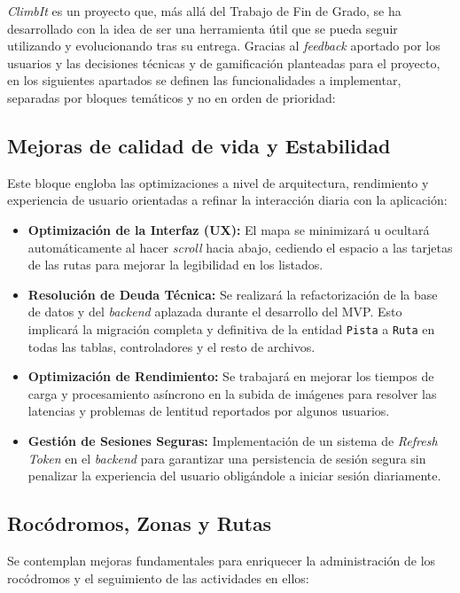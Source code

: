 \textit{ClimbIt} es un proyecto que, más allá del Trabajo de Fin de Grado, se ha desarrollado con la idea de ser una herramienta útil que se pueda seguir utilizando y evolucionando tras su entrega. Gracias al \textit{feedback} aportado por los usuarios y las decisiones técnicas y de gamificación planteadas para el proyecto, en los siguientes apartados se definen las funcionalidades a implementar, separadas por bloques temáticos y no en orden de prioridad:

\subsection{Mejoras de calidad de vida y Estabilidad}
Este bloque engloba las optimizaciones a nivel de arquitectura, rendimiento y experiencia de usuario orientadas a refinar la interacción diaria con la aplicación:

\begin{itemize}
    \item \textbf{Optimización de la Interfaz (UX):} El mapa se minimizará u ocultará automáticamente al hacer \textit{scroll} hacia abajo, cediendo el espacio a las tarjetas de las rutas para mejorar la legibilidad en los listados.
    \item \textbf{Resolución de Deuda Técnica:} Se realizará la refactorización de la base de datos y del \textit{backend} aplazada durante el desarrollo del MVP. Esto implicará la migración completa y definitiva de la entidad \texttt{Pista} a \texttt{Ruta} en todas las tablas, controladores y el resto de archivos.
    \item \textbf{Optimización de Rendimiento:} Se trabajará en mejorar los tiempos de carga y procesamiento asíncrono en la subida de imágenes para resolver las latencias y problemas de lentitud reportados por algunos usuarios.
    \item \textbf{Gestión de Sesiones Seguras:} Implementación de un sistema de \textit{Refresh Token} en el \textit{backend} para garantizar una persistencia de sesión segura sin penalizar la experiencia del usuario obligándole a iniciar sesión diariamente.
\end{itemize}

\subsection{Rocódromos, Zonas y Rutas}
Se contemplan mejoras fundamentales para enriquecer la administración de los rocódromos y el seguimiento de las actividades en ellos:

